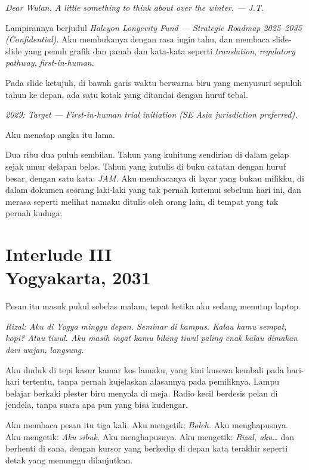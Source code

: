 \documentclass[11pt,twoside,openany]{book}
\begin{document}
\emph{Dear Wulan. A little something to think about over the winter. --- J.T.}

Lampirannya berjudul \emph{Halcyon Longevity Fund --- Strategic Roadmap 2025--2035 (Confidential)}. Aku membukanya dengan rasa ingin tahu, dan membaca slide-slide yang penuh grafik dan panah dan kata-kata seperti \emph{translation}, \emph{regulatory pathway}, \emph{first-in-human}.

Pada slide ketujuh, di bawah garis waktu berwarna biru yang menyusuri sepuluh tahun ke depan, ada satu kotak yang ditandai dengan huruf tebal.

\emph{2029: Target --- First-in-human trial initiation (SE Asia jurisdiction preferred).}

Aku menatap angka itu lama.

Dua ribu dua puluh sembilan. Tahun yang kuhitung sendirian di dalam gelap sejak umur delapan belas. Tahun yang kutulis di buku catatan dengan huruf besar, dengan satu kata: \emph{JAM.} Aku membacanya di layar yang bukan milikku, di dalam dokumen seorang laki-laki yang tak pernah kutemui sebelum hari ini, dan merasa seperti melihat namaku ditulis oleh orang lain, di tempat yang tak pernah kuduga.

\chapter*{Interlude III\\[0.5em]\normalsize\upshape Yogyakarta, 2031}
Pesan itu masuk pukul sebelas malam, tepat ketika aku sedang menutup laptop.

\emph{Rizal: Aku di Yogya minggu depan. Seminar di kampus. Kalau kamu sempat, kopi? Atau tiwul. Aku masih ingat kamu bilang tiwul paling enak kalau dimakan dari wajan, langsung.}

Aku duduk di tepi kasur kamar kos lamaku, yang kini kusewa kembali pada hari-hari tertentu, tanpa pernah kujelaskan alasannya pada pemiliknya. Lampu belajar berkaki plester biru menyala di meja. Radio kecil berdesis pelan di jendela, tanpa suara apa pun yang bisa kudengar.

Aku membaca pesan itu tiga kali. Aku mengetik: \emph{Boleh.} Aku menghapusnya. Aku mengetik: \emph{Aku sibuk.} Aku menghapusnya. Aku mengetik: \emph{Rizal, aku\ldots{}} dan berhenti di sana, dengan kursor yang berkedip di depan kata terakhir seperti detak yang menunggu dilanjutkan.
\end{document}
